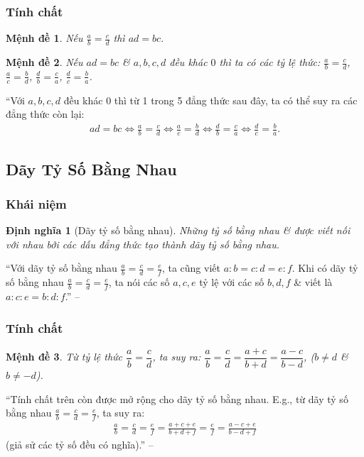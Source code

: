 \documentclass{article}
\numberwithin{equation}{section}
\newtheorem{dinhnghia}{Định nghĩa}[section]
\newtheorem{menhde}{Mệnh đề}[section]
\begin{document}
\subsubsection{Tính chất}

\begin{menhde}
	Nếu $\frac{a}{b} = \frac{c}{d}$ thì $ad = bc$.
\end{menhde}

\begin{menhde}
	Nếu $ad = bc$ \& $a,b,c,d$ đều khác $0$ thì ta có các tỷ lệ thức: $\frac{a}{b} = \frac{c}{d}$, $\frac{a}{c} = \frac{b}{d}$, $\frac{d}{b} = \frac{c}{a}$, $\frac{d}{c} = \frac{b}{a}$.
\end{menhde}
``Với $a,b,c,d$ đều khác $0$ thì từ 1 trong 5 đẳng thức sau đây, ta có thể suy ra các đẳng thức còn lại:
\begin{align*}
	ad = bc\Leftrightarrow\frac{a}{b} = \frac{c}{d}\Leftrightarrow\frac{a}{c} = \frac{b}{d}\Leftrightarrow\frac{d}{b} = \frac{c}{a}\Leftrightarrow\frac{d}{c} = \frac{b}{a}.
\end{align*}

\subsection{Dãy Tỷ Số Bằng Nhau}

\subsubsection{Khái niệm}

\begin{dinhnghia}[Dãy tỷ số bằng nhau]
	Những tỷ số bằng nhau \& được viết nối với nhau bởi các dấu đẳng thức tạo thành \emph{dãy tỷ số bằng nhau}.
\end{dinhnghia}
``Với dãy tỷ số bằng nhau $\frac{a}{b} = \frac{c}{d} = \frac{e}{f}$, ta cũng viết $a:b = c:d = e:f$. Khi có dãy tỷ số bằng nhau $\frac{a}{b} = \frac{c}{d} = \frac{e}{f}$, ta nói các số $a,c,e$ tỷ lệ với các số $b,d,f$ \& viết là $a:c:e = b:d:f$.'' -- \cite[p. 55]{SGK_Toan_7_Canh_Dieu_tap_1}

\subsubsection{Tính chất}

\begin{menhde}
	Từ tỷ lệ thức $\dfrac{a}{b} = \dfrac{c}{d}$, ta suy ra: $\dfrac{a}{b} = \dfrac{c}{d} = \dfrac{a + c}{b + d} = \dfrac{a - c}{b - d}$, ($b\ne d$ \& $b\ne -d$).
\end{menhde}
``Tính chất trên còn được mở rộng cho dãy tỷ số bằng nhau. E.g., từ dãy tỷ số bằng nhau $\frac{a}{b} = \frac{c}{d} = \frac{e}{f}$, ta suy ra:
\begin{align*}
	\frac{a}{b} = \frac{c}{d} = \frac{e}{f} = \frac{a + c + e}{b + d + f} = \frac{e}{f} = \frac{a - c + e}{b - d + f}
\end{align*}
(giả sử các tỷ số đều có nghĩa).'' -- \cite[p. 56]{SGK_Toan_7_Canh_Dieu_tap_1}
\end{document}
